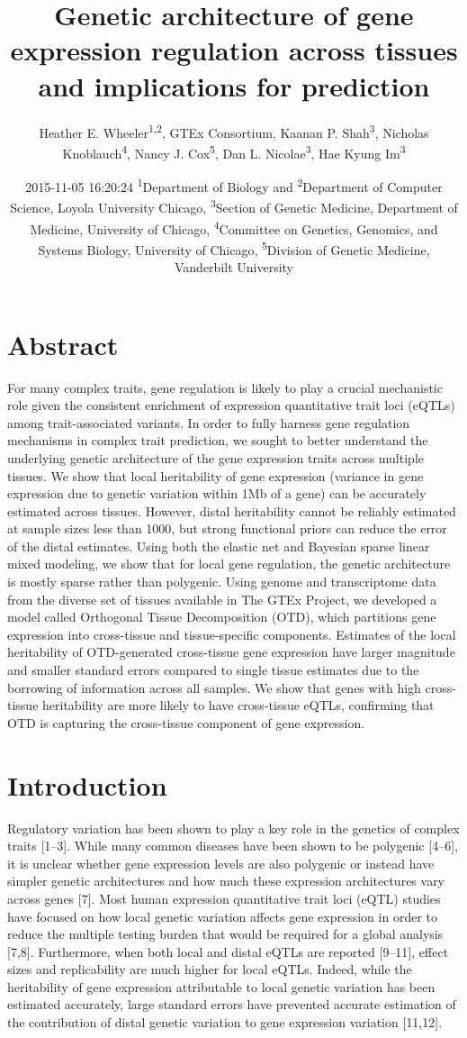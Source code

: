 \documentclass[]{article}
\title{Genetic architecture of gene expression regulation across tissues and
implications for prediction}
\author{Heather E. Wheeler\textsuperscript{1,2}, GTEx Consortium, Kaanan P.
Shah\textsuperscript{3}, Nicholas Knoblauch\textsuperscript{4}, Nancy J.
Cox\textsuperscript{5}, Dan L. Nicolae\textsuperscript{3}, Hae Kyung
Im\textsuperscript{3}}
\date{2015-11-05 16:20:24 \textsuperscript{1}Department of Biology and
\textsuperscript{2}Department of Computer Science, Loyola University
Chicago, \textsuperscript{3}Section of Genetic Medicine, Department of
Medicine, University of Chicago, \textsuperscript{4}Committee on
Genetics, Genomics, and Systems Biology, University of Chicago,
\textsuperscript{5}Division of Genetic Medicine, Vanderbilt University}
\begin{document}
\maketitle


\section{Abstract}\label{abstract}

For many complex traits, gene regulation is likely to play a crucial
mechanistic role given the consistent enrichment of expression
quantitative trait loci (eQTLs) among trait-associated variants. In
order to fully harness gene regulation mechanisms in complex trait
prediction, we sought to better understand the underlying genetic
architecture of the gene expression traits across multiple tissues. We
show that local heritability of gene expression (variance in gene
expression due to genetic variation within 1Mb of a gene) can be
accurately estimated across tissues. However, distal heritability cannot
be reliably estimated at sample sizes less than 1000, but strong
functional priors can reduce the error of the distal estimates. Using
both the elastic net and Bayesian sparse linear mixed modeling, we show
that for local gene regulation, the genetic architecture is mostly
sparse rather than polygenic. Using genome and transcriptome data from
the diverse set of tissues available in The GTEx Project, we developed a
model called Orthogonal Tissue Decomposition (OTD), which partitions
gene expression into cross-tissue and tissue-specific components.
Estimates of the local heritability of OTD-generated cross-tissue gene
expression have larger magnitude and smaller standard errors compared to
single tissue estimates due to the borrowing of information across all
samples. We show that genes with high cross-tissue heritability are more
likely to have cross-tissue eQTLs, confirming that OTD is capturing the
cross-tissue component of gene expression.

\section{Introduction}\label{introduction}

Regulatory variation has been shown to play a key role in the genetics
of complex traits {[}1--3{]}. While many common diseases have been shown
to be polygenic {[}4--6{]}, it is unclear whether gene expression levels
are also polygenic or instead have simpler genetic architectures and how
much these expression architectures vary across genes {[}7{]}. Most
human expression quantitative trait loci (eQTL) studies have focused on
how local genetic variation affects gene expression in order to reduce
the multiple testing burden that would be required for a global analysis
{[}7,8{]}. Furthermore, when both local and distal eQTLs are reported
{[}9--11{]}, effect sizes and replicability are much higher for local
eQTLs. Indeed, while the heritability of gene expression attributable to
local genetic variation has been estimated accurately, large standard
errors have prevented accurate estimation of the contribution of distal
genetic variation to gene expression variation {[}11,12{]}.
\end{document}
